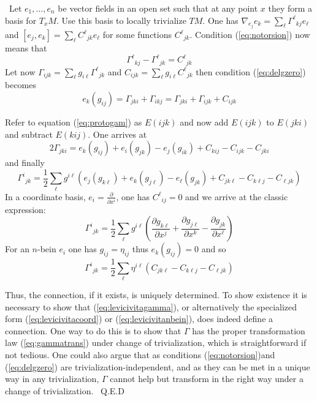\documentclass[12pt,titlepage]{article}
\def\ppv#1#2{\frac{\partial}{\partial #1^#2}}
\newenvironment{proof}{{\em Proof:\/}\ }{\ Q.E.D}
\begin{document}
\begin{proof}Let \(e_1,\dots,e_n\) be vector fields in an 
open set such that at any point \(x\) they form a basis for \(T_xM\). Use 
this basis to locally trivialize \(TM\).  One has \(\nabla_{e_j}e_k = 
\sum_\ell \Gamma^\ell{}_{kj}e_\ell\) and \([e_j,e_k]=\sum_\ell 
C^\ell{}_{jk}e_\ell\) for some functions \(C^\ell{}_{jk}\).  Condition 
(\ref{eq:notorsion}) now means that
\[ 
\Gamma^\ell{}_{kj}-\Gamma^\ell{}_{jk}=C^\ell{}_{jk}
\]%
 Let now \(\Gamma_{ijk}=\sum_\ell g_{i\ell}\Gamma^\ell{}_{jk}\) and  
\(C_{ijk} = \sum_\ell g_{i\ell}C^\ell{}_{jk}\) then condition 
(\ref{eq:delgzero}) becomes
\begin{equation}\label{eq:protogam}%
e_k(g_{ij})=\Gamma_{jki} + \Gamma_{ikj} =  \Gamma_{jki} + 
\Gamma_{ijk} + C_{ijk}
\end{equation}%

Refer to equation (\ref{eq:protogam}) as \(E(ijk)\) and 
now add \(E(ijk)\) to 
\(E(jki)\) and subtract \(E(kij)\). One arrives at
\[
2\Gamma_{jki} = e_k(g_{ij}) + e_i(g_{jk})-e_j(g_{ik})+C_{kij}-C_{ijk}-
C_{jki}
\]
and finally
\begin{equation}\label{eq:levicivitagamma}%
\Gamma^i{}_{jk} = \frac{1}{2} \sum_\ell 
g^{i\ell}(e_j(g_{k\ell})+e_k(g_{j\ell})-e_\ell (g_{jk})+C_{jk\ell}-C_{k\ell 
j}-C_{\ell jk})
\end{equation}%
In  a coordinate basis, \(e_i=\ppv{x}{i}\),  one has 
\(C^\ell{}_{ij}=0\) and we arrive at the classic expression:
\begin{equation}\label{eq:levicivitacoord}%
\Gamma^i{}_{jk} = \frac{1}{2} \sum_\ell g^{i\ell}\left(\frac{\partial 
g_{k\ell}}{\partial x^j}+ \frac{\partial g_{j\ell}}{\partial x^k}-
\frac{\partial g_{jk}}{\partial x^\ell}\right)
\end{equation}%
For an \(n\)-bein \(e_i\) one has \(g_{ij}=\eta_{ij}\) 
thus \(e_k(g_{ij})=0\) 
and so 
\begin{equation}\label{eq:levicivitanbein}%
\Gamma^i{}_{jk} = \frac{1}{2} \sum_\ell \eta^{i\ell}
(C_{jk\ell}-C_{k\ell j}-
C_{\ell jk})
\end{equation}%

Thus, the connection, if it exists, is uniquely determined. 
To show 
existence it is necessary to show that (\ref{eq:levicivitagamma}), or 
alternatively the specialized form (\ref{eq:levicivitacoord}) or 
(\ref{eq:levicivitanbein}), does indeed define a connection. One way to do 
this is to show that \(\Gamma\) has the proper transformation law 
(\ref{eq:gammatrans}) under change of trivialization, which is 
straightforward if not tedious. One could also argue that as conditions 
(\ref{eq:notorsion})and  (\ref{eq:delgzero}) are 
trivialization-independent, 
and as they can be met in a unique way in any trivialization,  \(\Gamma\) 
cannot help but transform in the right way under a 
change of trivialization.
\end{proof}%
\end{document}
